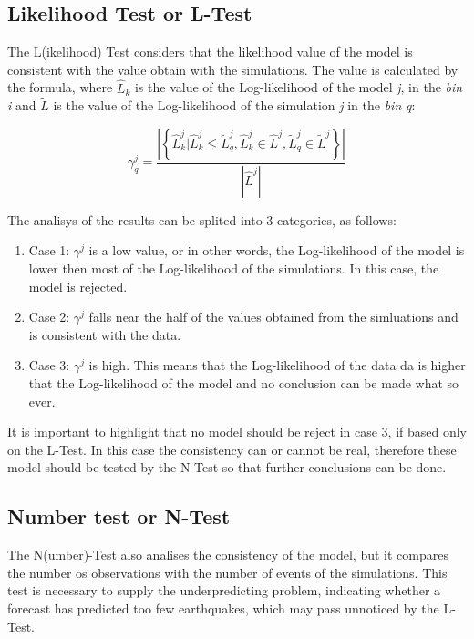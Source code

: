 \subsection{Likelihood Test or L-Test}
 
The L(ikelihood) Test considers that the likelihood value of the model is consistent with the value obtain with the simulations. The value is calculated by the formula, where $\widehat{L}_k$ is the value of the Log-likelihood of the model {\it j}, in the {\it bin} {\it i} and $\widetilde{L}$ is the value of the Log-likelihood of the simulation {\it j} in the {\it bin} {\it q}:


\begin{equation}
\gamma^{j}_{q} = \frac{\left| \left\{ \widehat{L}^j_k | \widehat{L}^j_k \leq \widetilde{L}^j_q, \widehat{L}^j_k \in \widehat{L}^j, \widetilde{L}^j_q \in \widetilde{L}^j  \right\} \right|}  {|\widehat{L}^j|}
\end{equation}

The analisys of the results can be splited into 3 categories, as follows:

\begin{enumerate}
\item Case 1: $\gamma^{j}$ is a low value, or in other words, the
  Log-likelihood of the model is lower then most of the Log-likelihood
  of the simulations. In this case, the model is rejected.
\item Case 2: $\gamma^{j}$ falls near the half of the values obtained
  from the simluations and is consistent with the data.
\item Case 3: $\gamma^{j}$ is high. This means that the Log-likelihood
  of the data da is higher that the Log-likelihood of the model and no
  conclusion can be made what so ever.
\end{enumerate}


It is important to highlight that no model should be reject in case 3, if based only on the L-Test. In this case the consistency can or cannot be real, therefore these model should be tested by the N-Test so that further conclusions can be done.\\

\subsection{Number test or N-Test}
The N(umber)-Test also analises the consistency of the model, but it compares the number os observations with the number of events of the simulations. This test is necessary to supply the underpredicting problem, indicating whether a forecast has predicted too few earthquakes, which may pass unnoticed by the L-Test.\\

